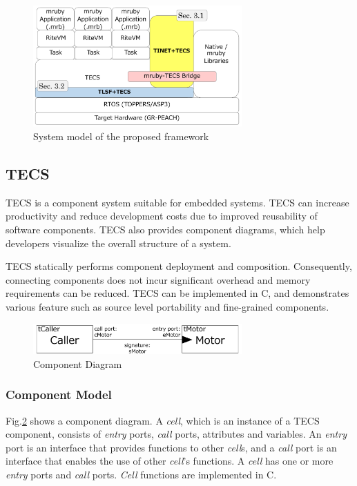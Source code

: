 \documentclass[JIP]{ipsj_v2/UTF8/ipsj}
\begin{document}
\begin{figure}[t]
    \centering
    \includegraphics[width=8cm,clip]{figure/SystemModel.pdf}
    \caption{System model of the proposed framework}
    \label{fig:SystemModel}
\end{figure}

\subsection{TECS}
\label{sec:TECS}

TECS is a component system suitable for embedded systems.
TECS can increase productivity and reduce development costs due to improved reusability of software components.
TECS also provides component diagrams, which help developers visualize the overall structure of a system.

TECS statically performs component deployment and composition.
Consequently, connecting components does not incur significant overhead and memory requirements can be reduced.
TECS can be implemented in C, and demonstrates various feature such as source level portability and fine-grained components.

\begin{figure}[t]
    \centering
    \includegraphics[width=8cm,clip]{figure/component_diagram.pdf}
    \caption{Component Diagram}
    \label{fig:component}
\end{figure}

\subsubsection{Component Model}
Fig.\ref{fig:component} shows a component diagram.
A {\it cell}, which is an instance of a TECS component, consists of {\it entry} ports, {\it call} ports, attributes and variables.
An {\it entry} port is an interface that provides functions to other {\it cell}s, and a {\it call} port is an interface that enables the use of other {\it cell}'s functions.
A {\it cell} has one or more {\it entry} ports and {\it call} ports.
{\it Cell} functions are implemented in C.
\end{document}
